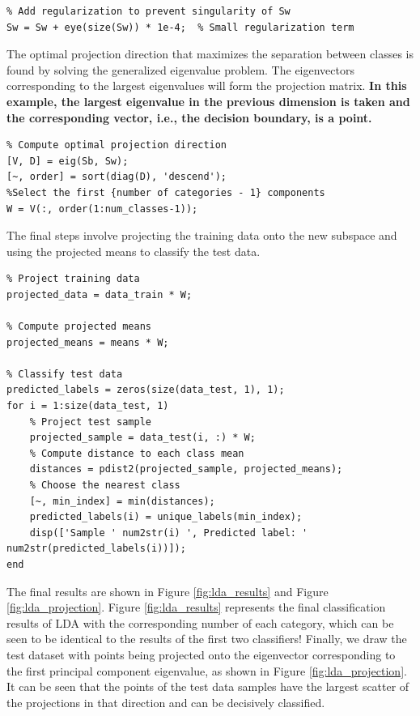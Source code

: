 \documentclass[12pt, onecolumn]{article}
\begin{document}
\begin{verbatim}
% Add regularization to prevent singularity of Sw
Sw = Sw + eye(size(Sw)) * 1e-4;  % Small regularization term
\end{verbatim}

The optimal projection direction that maximizes the separation between classes is found by solving the generalized eigenvalue problem. The eigenvectors corresponding to the largest eigenvalues will form the projection matrix. \textbf{In this example, the largest eigenvalue in the previous dimension is taken and the corresponding vector, i.e., the decision boundary, is a point.}

\begin{verbatim}
% Compute optimal projection direction
[V, D] = eig(Sb, Sw);
[~, order] = sort(diag(D), 'descend');
%Select the first {number of categories - 1} components
W = V(:, order(1:num_classes-1)); 
\end{verbatim}

The final steps involve projecting the training data onto the new subspace and using the projected means to classify the test data.

\begin{verbatim}
% Project training data
projected_data = data_train * W;

% Compute projected means
projected_means = means * W;

% Classify test data
predicted_labels = zeros(size(data_test, 1), 1);
for i = 1:size(data_test, 1)
    % Project test sample
    projected_sample = data_test(i, :) * W;
    % Compute distance to each class mean
    distances = pdist2(projected_sample, projected_means);
    % Choose the nearest class
    [~, min_index] = min(distances);
    predicted_labels(i) = unique_labels(min_index);
    disp(['Sample ' num2str(i) ', Predicted label: ' num2str(predicted_labels(i))]);
end
\end{verbatim}

The final results are shown in Figure \ref{fig:lda_results} and Figure \ref{fig:lda_projection}. Figure \ref{fig:lda_results} represents the final classification results of LDA with the corresponding number of each category, which can be seen to be identical to the results of the first two classifiers! Finally, we draw the test dataset with points being projected onto the eigenvector corresponding to the first principal component eigenvalue, as shown in Figure \ref{fig:lda_projection}. It can be seen that the points of the test data samples have the largest scatter of the projections in that direction and can be decisively classified.
\end{document}
